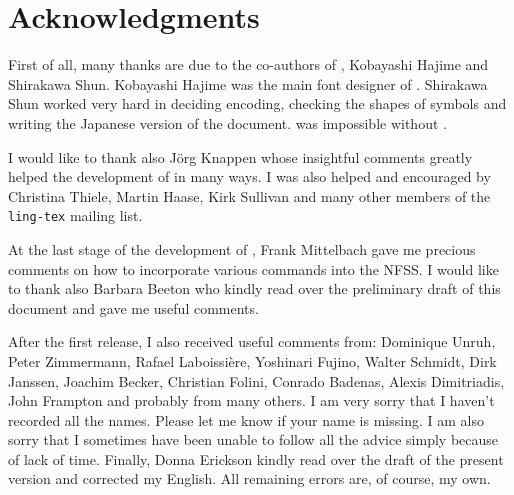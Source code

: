 \clearemptydoublepage
\chapter*{Acknowledgments}

First of all, many thanks are due to the co-authors of \tsipa{},
Kobayashi Hajime and Shirakawa Shun. Ko\-ba\-yashi Hajime was the main
font designer of \tsipa{}. Shirakawa Shun worked very hard in deciding
encoding, checking the shapes of symbols and writing the Japanese
version of the document. \tipa{} was impossible without \tsipa{}.

I would like to thank also J\"org Knappen whose insightful comments
greatly helped the development of \tipa{} in many ways. I was also
helped and encouraged by Christina Thiele, Martin Haase, Kirk Sullivan
and many other members of the \texttt{ling-tex} mailing list.

At the last stage of the development of \tipa{}, Frank Mittelbach gave
me precious comments on how to incorporate various \tipa{} commands
into the NFSS. I would like to thank also Barbara Beeton who kindly
read over the preliminary draft of this document and gave me useful
comments.

After the first release, I also received useful comments from:
Dominique Unruh, Peter Zimmermann, Rafael Laboissi\`ere, Yoshinari
Fujino, Walter Schmidt, Dirk Janssen, Joachim Becker, Christian
Folini, Conrado Badenas, Alexis Dimitriadis, John Frampton and
probably from many others. I am very sorry that I haven't recorded all
the names. Please let me know if your name is missing. I am also sorry
that I sometimes have been unable to follow all the advice simply
because of lack of time. Finally, Donna Erickson kindly read over the
draft of the present version and corrected my English. All remaining
errors are, of course, my own.

\clearemptydoublepage



